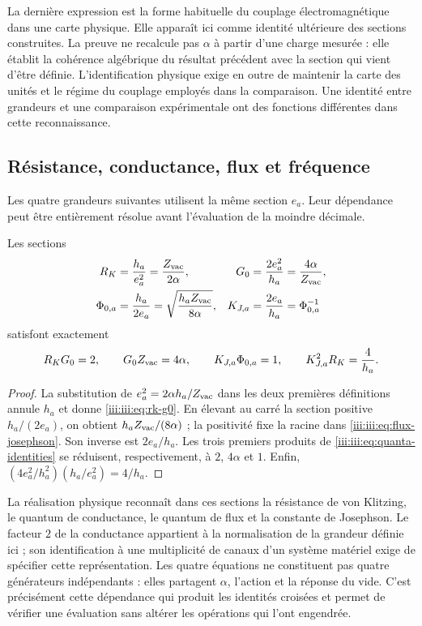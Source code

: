 La dernière expression est la forme habituelle du couplage électromagnétique
dans une carte physique. Elle apparaît ici comme identité ultérieure des sections
construites. La preuve ne recalcule pas $\alpha$ à partir d’une charge
mesurée : elle établit la cohérence algébrique du résultat précédent avec la
section qui vient d’être définie. L’identification physique exige en outre
de maintenir la carte des unités et le régime du couplage employés dans la
comparaison. Une identité entre grandeurs et une comparaison expérimentale
ont des fonctions différentes dans cette reconnaissance.

\subsection{Résistance, conductance, flux et fréquence}

Les quatre grandeurs suivantes utilisent la même section $e_a$. Leur
dépendance peut être entièrement résolue avant l’évaluation de la moindre décimale.

\begin{theorem}
Les sections
\begin{align}
 R_K&=\frac{h_a}{e_a^2}=\frac{Z_{\rm vac}}{2\alpha},
 &G_0&=\frac{2e_a^2}{h_a}=\frac{4\alpha}{Z_{\rm vac}},
 \label{iii:iii:eq:rk-g0}\\
 \Phi_{0,a}&=\frac{h_a}{2e_a}
 =\sqrt{\frac{h_aZ_{\rm vac}}{8\alpha}},
 &K_{J,a}&=\frac{2e_a}{h_a}=\Phi_{0,a}^{-1}
 \label{iii:iii:eq:flux-josephson}
\end{align}
satisfont exactement
\begin{equation}
 R_KG_0=2,\qquad G_0Z_{\rm vac}=4\alpha,\qquad
 K_{J,a}\Phi_{0,a}=1,\qquad
 K_{J,a}^{2}R_K=\frac4{h_a}.
 \label{iii:iii:eq:quanta-identities}
\end{equation}
\end{theorem}
\begin{proof}
La substitution de $e_a^2=2\alpha h_a/Z_{\rm vac}$ dans les deux premières
définitions annule $h_a$ et donne \eqref{iii:iii:eq:rk-g0}. En élevant au
carré la section positive $h_a/(2e_a)$, on obtient
$h_aZ_{\rm vac}/(8\alpha)$ ; la positivité fixe la racine dans
\eqref{iii:iii:eq:flux-josephson}. Son inverse est $2e_a/h_a$.
Les trois premiers produits de \eqref{iii:iii:eq:quanta-identities} se
réduisent, respectivement, à $2$, $4\alpha$ et $1$. Enfin,
$(4e_a^2/h_a^2)(h_a/e_a^2)=4/h_a$.
\end{proof}

La réalisation physique reconnaît dans ces sections la résistance de von Klitzing, le quantum de conductance, le quantum de flux et la constante de Josephson. Le facteur $2$ de la conductance appartient à la normalisation de la grandeur définie ici ; son identification à une multiplicité de canaux d'un système matériel exige de spécifier cette représentation.
Les quatre équations ne constituent pas quatre générateurs indépendants : elles partagent $\alpha$, l'action et la réponse du vide. C'est précisément cette dépendance qui produit les identités croisées et permet de vérifier une évaluation sans altérer les opérations qui l'ont engendrée.

